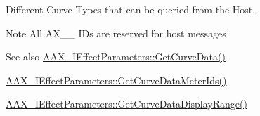 Different Curve Types that can be queried from the Host. 

\begin{DoxyNote}{Note}
All \textquotesingle{}A\+X\+\_\+\+\_\+\textquotesingle{} I\+Ds are reserved for host messages
\end{DoxyNote}
\begin{DoxySeeAlso}{See also}
\mbox{\hyperlink{a00812_gaa85bda4027342eb644a9c92a17da6d49}{A\+A\+X\+\_\+\+I\+Effect\+Parameters\+::\+Get\+Curve\+Data()}} 

\mbox{\hyperlink{a00812_gac7ba3c1063c35d761fdeba9c9a6cc0d1}{A\+A\+X\+\_\+\+I\+Effect\+Parameters\+::\+Get\+Curve\+Data\+Meter\+Ids()}} 

\mbox{\hyperlink{a00812_ga38d1ac0c15a7052904077ef0e2527e0d}{A\+A\+X\+\_\+\+I\+Effect\+Parameters\+::\+Get\+Curve\+Data\+Display\+Range()}} 
\end{DoxySeeAlso}
